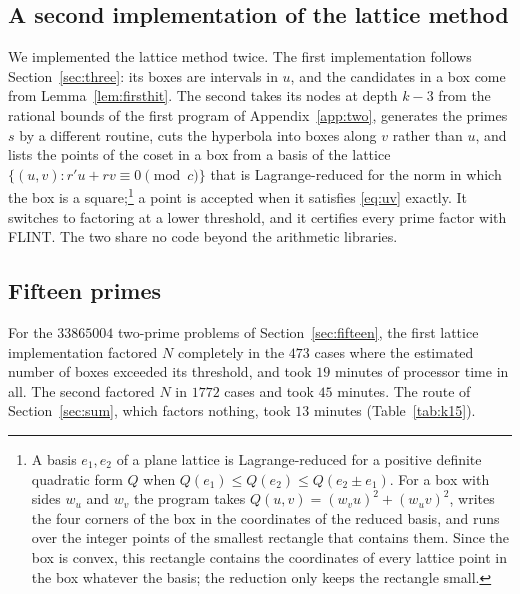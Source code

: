 \documentclass[11pt,reqno]{amsart}
\numberwithin{equation}{section}
\theoremstyle{plain}
\theoremstyle{definition}
\theoremstyle{remark}
\begin{document}
\subsection{A second implementation of the lattice method}\label{app:second}
We implemented the lattice method twice. The first implementation
follows Section~\ref{sec:three}: its boxes are intervals in $u$, and the candidates
in a box come from Lemma~\ref{lem:firsthit}. The second takes its
nodes at depth $k-3$ from the rational bounds of the first program of
Appendix~\ref{app:two}, generates the primes $s$ by a different
routine, cuts the hyperbola into boxes along $v$ rather than $u$, and
lists the points of the coset in a box from a basis of the lattice
$\{(u,v):r'u+rv\equiv0\pmod c\}$ that is Lagrange-reduced for the norm
in which the box is a square;\footnote{A basis $e_1,e_2$ of a plane
lattice is Lagrange-reduced for a positive definite quadratic form $Q$
when $Q(e_1)\le Q(e_2)\le Q(e_2\pm e_1)$. For a box with sides $w_u$
and $w_v$ the program takes $Q(u,v)=(w_vu)^2+(w_uv)^2$, writes the
four corners of the box in the coordinates of the reduced basis, and
runs over the integer points of the smallest rectangle that contains
them. Since the box is convex, this rectangle contains the coordinates
of every lattice point in the box whatever the basis; the reduction
only keeps the rectangle small.} a point is accepted when it satisfies
\eqref{eq:uv} exactly. It switches to factoring at a lower threshold,
and it certifies every prime factor with FLINT. The two share no code
beyond the arithmetic libraries.

\subsection{Fifteen primes}\label{app:fifteen}
For the $33865004$ two-prime problems of Section~\ref{sec:fifteen},
the first lattice implementation factored $N$ completely in the $473$
cases where the estimated number of boxes exceeded its threshold, and
took $19$ minutes of processor time in all. The second factored $N$ in
$1772$ cases and took $45$ minutes. The route of
Section~\ref{sec:sum}, which factors nothing, took $13$ minutes
(Table~\ref{tab:k15}).
\end{document}
